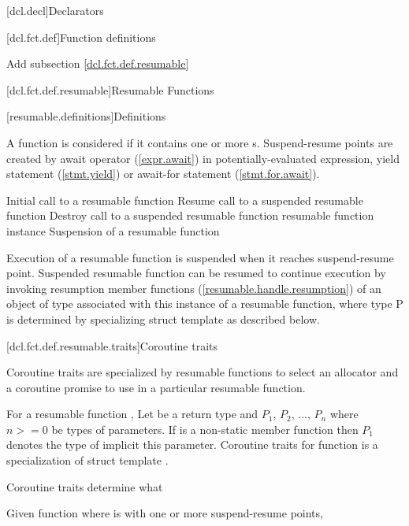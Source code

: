 
[dcl.decl]{Declarators}

\setcounter{section}{3}
[dcl.fct.def]{Function definitions}

Add subsection \ref{dcl.fct.def.resumable}

\setcounter{subsection}{3}
[dcl.fct.def.resumable]{Resumable Functions}

[resumable.definitions]{Definitions}

\pnum
A function is considered  if it contains
one or more s. 
Suspend-resume points are created by await operator (\ref{expr.await}) in potentially-evaluated expression, yield statement (\ref{stmt.yield}) 
or await-for statement (\ref{stmt.for.await}).

\pnum
Initial call to a resumable function
Resume call to a suspended resumable function
Destroy call to a suspended resumable function
resumable function instance
\pnum
Suspension of a resumable function 

\pnum
Execution of a resumable function is suspended when it reaches suspend-resume point.
Suspended resumable function can be resumed
to continue execution by invoking
resumption member functions (\ref{resumable.handle.resumption}) of an object of  type
associated with this instance of a resumable function, where type P
is determined by specializing struct template  as described below. 

[dcl.fct.def.resumable.traits]{Coroutine traits}

\pnum
Coroutine traits are specialized by resumable functions to select an allocator and a coroutine promise to
use in a particular resumable function.

\pnum
For a resumable function , Let  be a return type and $P_1$, $P_2$, ..., $P_n$
where $n >= 0$ be types of parameters. If  is a non-static member function then $P_1$ denotes the type of implicit this parameter. 
Coroutine traits for function  is a specialization of
struct template .

\pnum
Coroutine traits determine what 


\pnum Given function  where  is  with one or more suspend-resume points, 

